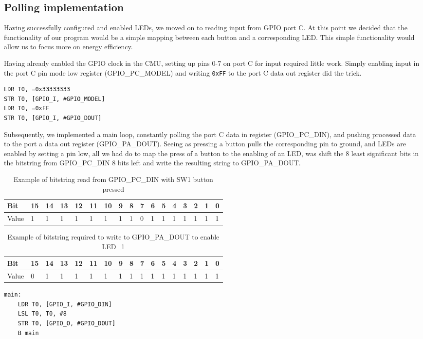 \subsection{Polling implementation}
\label{sec:polling-implementation}

Having successfully configured and enabled LEDs, we moved on to reading input from GPIO port C. At this point we decided that the functionality of our program would be a simple mapping between each button and a corresponding LED. This simple functionality would allow us to focus more on energy efficiency.

\vspace{1cm}

Having already enabled the GPIO clock in the CMU, setting up pins 0-7 on port C for input required little work. Simply enabling input in the port C pin mode low register (GPIO\_PC\_MODEL) and writing \texttt{0xFF} to the port C data out register did the trick.

\begin{lstlisting}[label=enable-gpio-input, caption=Enabling input on port C]
LDR T0, =0x33333333
STR T0, [GPIO_I, #GPIO_MODEL]
LDR T0, =0xFF
STR T0, [GPIO_I, #GPIO_DOUT]
\end{lstlisting}

Subsequently, we implemented a main loop, constantly polling the port C data in register (GPIO\_PC\_DIN), and pushing processed data to the port a data out register (GPIO\_PA\_DOUT). Seeing as pressing a button pulls the corresponding pin to ground, and LEDs are enabled by setting a pin low, all we had do to map the press of a button to the enabling of an LED, was shift the 8 least significant bits in the bitstring from GPIO\_PC\_DIN 8 bits left and write the resulting string to GPIO\_PA\_DOUT. 

\begin{table}[!h]
    \begin{tabular}{l|l|l|l|l|l|l|l|l|l|l|l|l|l|l|l|l}
    Bit   & 15 & 14 & 13 & 12 & 11 & 10 & 9 & 8 & 7 & 6 & 5 & 4 & 3 & 2 & 1 & 0 \\ \hline
    Value & 1  & 1  & 1  & 1  & 1  & 1  & 1 & 1 & 0 & 1 & 1 & 1 & 1 & 1 & 1 & 1 \\
    \end{tabular}
    \caption{Example of bitstring read from GPIO\_PC\_DIN with SW1 button pressed}
\end{table}

\begin{table}[!h]
    \begin{tabular}{l|l|l|l|l|l|l|l|l|l|l|l|l|l|l|l|l}
    Bit   & 15 & 14 & 13 & 12 & 11 & 10 & 9 & 8 & 7 & 6 & 5 & 4 & 3 & 2 & 1 & 0 \\ \hline
    Value & 0  & 1  & 1  & 1  & 1  & 1  & 1 & 1 & 1 & 1 & 1 & 1 & 1 & 1 & 1 & 1 \\
    \end{tabular}
    \caption{Example of bitstring required to write to GPIO\_PA\_DOUT to enable LED\_1}
\end{table}


\newpage

\begin{lstlisting}[label=main-polling-loop, caption=Main loop]
main:
    LDR T0, [GPIO_I, #GPIO_DIN]
    LSL T0, T0, #8
    STR T0, [GPIO_O, #GPIO_DOUT]
    B main
\end{lstlisting}
